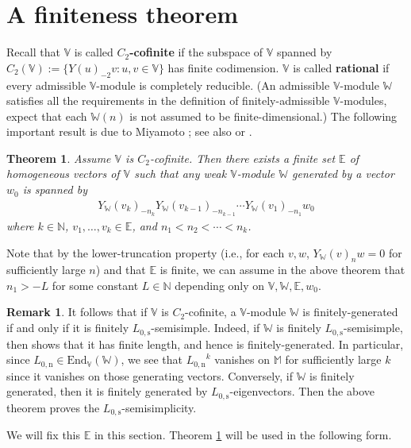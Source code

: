\documentclass[11pt,b5paper,notitlepage]{article}
\theoremstyle{definition}
\newtheorem{rem}[df]{Remark}
\theoremstyle{plain}
\newtheorem{thm}[df]{Theorem}
\newcommand{\End}{\mathrm{End}} %
\newcommand{\Vbb}{\mathbb V}
\newcommand{\Wbb}{\mathbb W}
\newcommand{\Mbb}{\mathbb M}
\newcommand{\Nbb}{\mathbb N}
\newcommand{\Ebb}{\mathbb E}
\newcommand{\Lss}{{L_{0,\mathrm{s}}}}
\newcommand{\Lni}{{L_{0,\mathrm{n}}}}
\numberwithin{equation}{section}
\begin{document}
\section{A finiteness theorem}


Recall that $\Vbb$ is called \textbf{$C_2$-cofinite} if the subspace of $\Vbb$ spanned by $C_2(\Vbb):=\{Y(u)_{-2}v:u,v\in\Vbb \}$  has finite codimension. $\Vbb$ is called \textbf{rational} if every admissible $\Vbb$-module is completely reducible. (An admissible $\Vbb$-module $\Wbb$ satisfies all the requirements in the definition of finitely-admissible $\Vbb$-modules, expect that each $\Wbb(n)$ is not assumed to be finite-dimensional.) The following important result is due to Miyamoto \cite[Lemma 2.4]{Miy04}; see also \cite{GN03} or \cite[Thm. 1]{Buhl02}.

\begin{thm}\label{lb19}
Assume $\Vbb$ is $C_2$-cofinite. Then there exists a finite set $\Ebb$ of homogeneous vectors of $\Vbb$   such that any weak $\Vbb$-module $\Wbb$ generated by a vector $w_0$ is spanned by
	\begin{align}
	Y_\Wbb(v_k)_{-n_k}Y_\Wbb(v_{k-1})_{-n_{k-1}}\cdots Y_\Wbb(v_1)_{-n_1} w_0\label{eq39}
	\end{align}
where $k\in\Nbb$, $v_1,\dots,v_k\in\Ebb$, and $n_1<n_2<\cdots<n_k$.
\end{thm}

Note that by the lower-truncation property (i.e., for each $v,w$, $Y_\Wbb(v)_nw=0$ for sufficiently large $n$) and that $\Ebb$ is finite, we can assume in the above theorem that $n_1>-L$ for some constant $L\in\Nbb$ depending only on $\Vbb,\Wbb,\Ebb,w_0$. 

\begin{rem}\label{lb61}
It follows that if $\Vbb$ is $C_2$-cofinite, a $\Vbb$-module $\Wbb$ is finitely-generated if and only if it is finitely $\Lss$-semisimple. Indeed, if $\Wbb$ is finitely $\Lss$-semisimple, then \cite[Cor. 3.16]{Hua09} shows that it has finite length, and hence is finitely-generated. In particular, since $\Lni\in\End_\Vbb(\Wbb)$, we see that $\Lni^k$ vanishes on $\Mbb$ for sufficiently large $k$ since it vanishes on those generating vectors. Conversely, if $\Wbb$ is finitely generated, then it is finitely generated by $\Lss$-eigenvectors. Then the above theorem proves the $\Lss$-semisimplicity.
\end{rem}


We will fix this $\Ebb$ in this section.  Theorem \ref{lb19} will be used in the following form.
\end{document}
